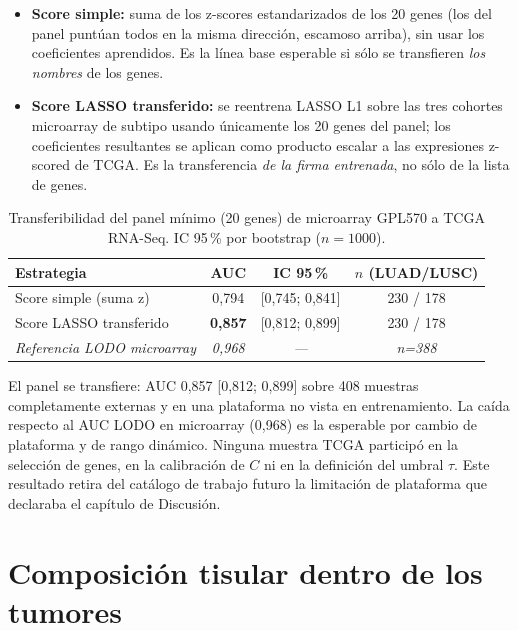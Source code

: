 \begin{itemize}
  \item \textbf{Score simple:} suma de los z-scores estandarizados de los
  20 genes (los del panel puntúan todos en la misma dirección, escamoso
  arriba), sin usar los coeficientes aprendidos. Es la línea base
  esperable si sólo se transfieren \emph{los nombres} de los genes.
  \item \textbf{Score LASSO transferido:} se reentrena LASSO L1 sobre las
  tres cohortes microarray de subtipo usando únicamente los 20 genes del
  panel; los coeficientes resultantes se aplican como producto escalar a
  las expresiones z-scored de TCGA. Es la transferencia \emph{de la firma
  entrenada}, no sólo de la lista de genes.
\end{itemize}

\begin{table}[H]
  \centering
  \small
  \caption{Transferibilidad del panel mínimo (20 genes) de microarray
  GPL570 a TCGA RNA-Seq. IC 95\,\% por bootstrap ($n=1000$).}
  \label{tab:tcga}
  \begin{tabular}{lccc}
    \toprule
    \textbf{Estrategia} & \textbf{AUC} & \textbf{IC 95\,\%} & \textbf{$n$ (LUAD/LUSC)} \\
    \midrule
    Score simple (suma z)             & 0,794 & [0,745; 0,841] & 230 / 178 \\
    Score LASSO transferido           & \textbf{0,857} & [0,812; 0,899] & 230 / 178 \\
    \midrule
    \emph{Referencia LODO microarray} & \emph{0,968} & \emph{—} & \emph{n=388} \\
    \bottomrule
  \end{tabular}
\end{table}

El panel se transfiere: AUC 0,857 [0,812; 0,899] sobre 408 muestras
completamente externas y en una plataforma no vista en entrenamiento. La
caída respecto al AUC LODO en microarray (0,968) es la esperable por
cambio de plataforma y de rango dinámico. Ninguna muestra TCGA
participó en la selección de genes, en la calibración de $C$ ni en la
definición del umbral $\tau$. Este resultado retira del catálogo de
trabajo futuro la limitación de plataforma que declaraba el capítulo de
Discusión.

\section{Composición tisular dentro de los tumores}
\label{sec:res_composicion}

